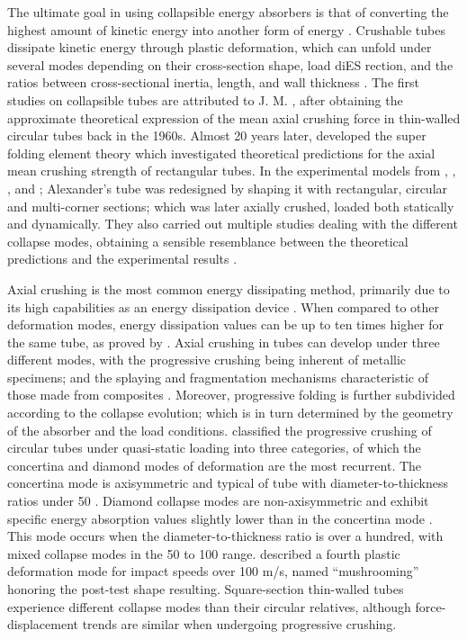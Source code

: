 \documentclass[12pt,number,preprint,review,times]{elsarticle}
\begin{document}
The ultimate goal in using collapsible energy absorbers is that of converting the highest amount of kinetic energy into another form of energy \citep{stronge2004impact}. Crushable tubes dissipate kinetic energy through plastic deformation, which can unfold under several modes depending on their cross-section shape, load diES
rection, and the ratios between cross-sectional inertia, length, and wall thickness \citep{lu2003energy}. The first studies on collapsible tubes are attributed to J. M. \citet{Alexander}, after obtaining the approximate theoretical expression of the mean axial crushing force in thin-walled circular tubes back in the 1960s. Almost 20 years later, \citet{wierzbicki1983crushing} developed the super folding element theory which investigated theoretical predictions for the axial mean crushing strength of rectangular tubes. In the experimental models from \citet{abramowicz1989axial}, \citet{abramowicz1986dynamic}, \citet{Pugsley19791}, and \citet{Singace19963517}; Alexander's tube was redesigned by shaping it with rectangular, circular and multi-corner sections; which was later axially crushed, loaded both statically and dynamically. They also carried out multiple studies dealing with the different collapse modes, obtaining a sensible resemblance between the theoretical predictions and the experimental results \citep{Abramowicz1997415}.

Axial crushing is the most common energy dissipating method, primarily due to its high capabilities as an energy dissipation device \citep{sadeghi1984design}. When compared to other deformation modes, energy dissipation values can be up to ten times higher for the same tube, as proved by \citet{reid1985metal}. Axial crushing in tubes can develop under three different modes, with the progressive crushing being inherent of metallic specimens; and the splaying and fragmentation mechanisms characteristic of those made from composites \citep{hull1991unified}. Moreover, progressive folding is further subdivided according to the collapse evolution; which is in turn determined by the geometry of the absorber and the load conditions. \citet{andrews1983classification} classified the progressive crushing of circular tubes under quasi-static loading into three categories, of which the concertina and diamond modes of deformation are the most recurrent. The concertina mode is axisymmetric and typical of tube with diameter-to-thickness ratios under 50 \citep{guillow2001quasi}. Diamond collapse modes are non-axisymmetric and exhibit specific energy absorption values slightly lower than in the concertina mode \citep{andrews1983classification}. This mode occurs when the diameter-to-thickness ratio is over a hundred, with mixed collapse modes in the 50 to 100 range. \citet{wang2002mushrooming} described a fourth plastic deformation mode for impact speeds over \num{100} m/s, named ``mushrooming'' honoring the post-test shape resulting. Square-section thin-walled tubes experience different collapse modes than their circular relatives, although force-displacement trends are similar when undergoing progressive crushing.
\end{document}
